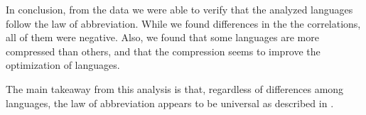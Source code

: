 In conclusion, from the data we were able to verify that the analyzed languages follow the law of abbreviation. While we found differences in the the correlations, all of them were negative. Also, we found that some languages are more compressed than others, and that the compression seems to improve the optimization of languages.

The main takeaway from this analysis is that, regardless of differences among languages, the law of abbreviation appears to be universal as described in \cite{bentz2016zipf}.